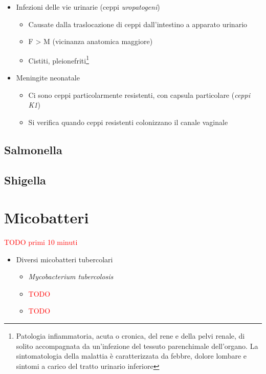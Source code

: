 \documentclass[italian,]{article}
\providecommand{\tightlist}{%
  \setlength{\itemsep}{0pt}\setlength{\parskip}{0pt}}
\newcommand{\TODO}[1]{\textcolor{red}{\textsf{\footnotesize{TODO #1}}}} %
\begin{document}
\begin{itemize}
\tightlist
\item
  Infezioni delle vie urinarie (ceppi \emph{uropatogeni})

  \begin{itemize}
  \tightlist
  \item
    Causate dalla traslocazione di ceppi dall'intestino a apparato
    urinario
  \item
    F \textgreater{} M (vicinanza anatomica maggiore)
  \item
    Cistiti, pleionefriti\footnote{Patologia infiammatoria, acuta o
      cronica, del rene e della pelvi renale, di solito accompagnata da
      un'infezione del tessuto parenchimale dell'organo. La
      sintomatologia della malattia è caratterizzata da febbre, dolore
      lombare e sintomi a carico del tratto urinario inferiore}
  \end{itemize}
\item
  Meningite neonatale

  \begin{itemize}
  \tightlist
  \item
    Ci sono ceppi particolarmente resistenti, con capsula particolare
    (\emph{ceppi K1})
  \item
    Si verifica quando ceppi resistenti colonizzano il canale vaginale
  \end{itemize}
\end{itemize}

\hypertarget{salmonella}{%
\subsection{Salmonella}\label{salmonella}}

\hypertarget{shigella}{%
\subsection{Shigella}\label{shigella}}

\hypertarget{micobatteri}{%
\section{Micobatteri}\label{micobatteri}}

\TODO{primi 10 minuti}

\begin{itemize}
\tightlist
\item
  Diversi micobatteri tubercolari

  \begin{itemize}
  \item
    \emph{Mycobacterium tubercolosis}
  \item
    \TODO{}
  \item
    \TODO{}
  \end{itemize}
\end{itemize}
\end{document}
